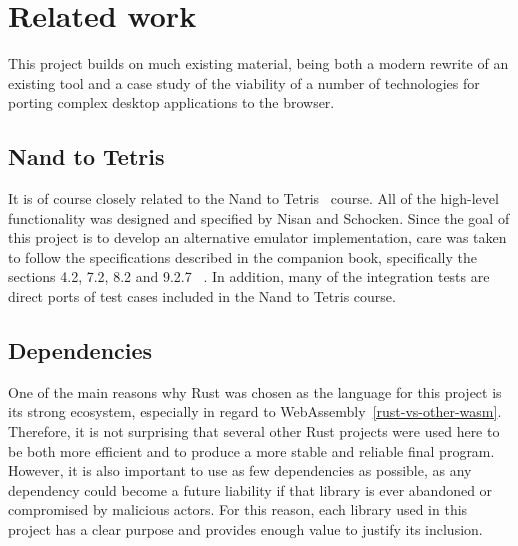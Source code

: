 \section{Related work}

This project builds on much existing material, being both a modern rewrite of an existing tool and a case study of the viability of a number of technologies for porting complex desktop applications to the browser.

\subsection{Nand to Tetris}

It is of course closely related to the Nand to Tetris~\cite{n2tweb} course. All of the high-level functionality was designed and specified by Nisan and Schocken.
Since the goal of this project is to develop an alternative emulator implementation, care was taken to follow the specifications described in the companion book, specifically the sections 4.2, 7.2, 8.2 and 9.2.7  ~\cite{nisan2005}.
In addition, many of the integration tests are direct ports of test cases included in the Nand to Tetris course.


\subsection{Dependencies}

One of the main reasons why Rust was chosen as the language for this project is its strong ecosystem, especially in regard to WebAssembly~\ref{rust-vs-other-wasm}.
Therefore, it is not surprising that several other Rust projects were used here to be both more efficient and to produce a more stable and reliable final program.
However, it is also important to use as few dependencies as possible, as any dependency could become a future liability if that library is ever abandoned or compromised by malicious actors.
For this reason, each library used in this project has a clear purpose and provides enough value to justify its inclusion.

